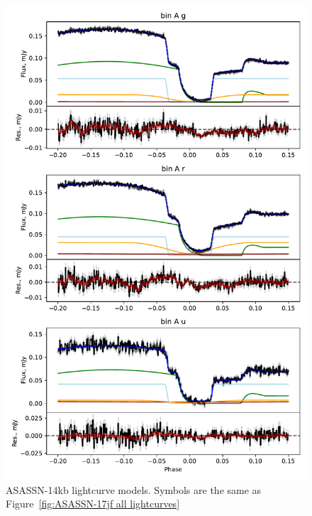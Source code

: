 \begin{figure}
    \centering
    \includegraphics[width=\textwidth]{figures/results/ASASSN-14kb/ASASSN-14kb_1.pdf}
    \caption{ASASSN-14kb lightcurve models. Symbols are the same as Figure~\ref{fig:ASASSN-17jf all lightcurves}}
    \label{fig:ASASSN-14kb all lightcurves}
\end{figure}



